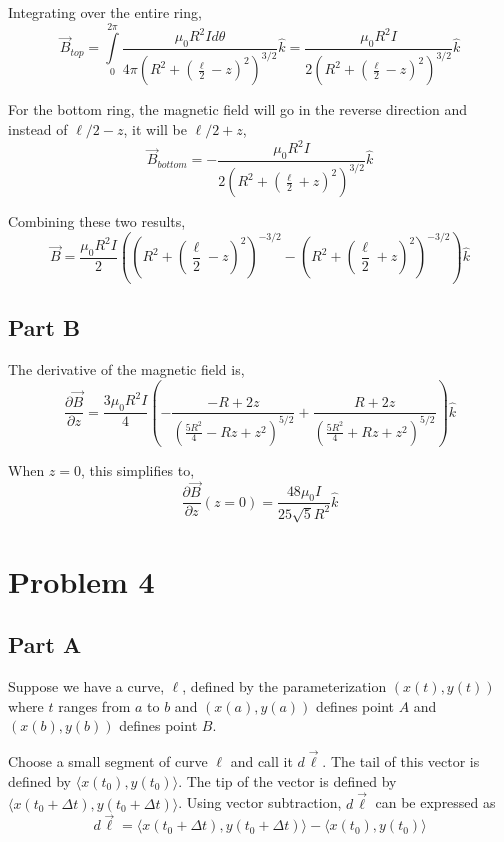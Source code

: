 \documentclass{article}
\begin{document}
Integrating over the entire ring,
$$ \vec{B}_{top} = \int\limits_{0}^{2\pi} \frac{ \mu_{0} R^{2} I d\theta }{ 4 \pi
\left( R^{2} + \left( \frac{ \ell }{ 2 } - z \right)^{2} \right)^{3/2} } \hat{k}
= \frac{ \mu_{0} R^{2} I }{ 2 \left( R^{2} + \left( \frac{ \ell }{ 2
} - z \right)^{2} \right)^{3/2} } \hat{k} $$

For the bottom ring, the magnetic field will go in the reverse direction and
instead of $\ell / 2 - z$, it will be $\ell / 2 + z$,
$$ \vec{B}_{bottom} = - \frac{ \mu_{0} R^{2} I }{ 2 \left( R^{2} + \left( \frac{ \ell }{ 2
} + z \right)^{2} \right)^{3/2} } \hat{k}$$

Combining these two results,
$$ \vec{B} = \frac{ \mu_{0} R^{2} I }{ 2 } \left( \left( R^{2} + \left( \frac{
\ell }{ 2 } - z \right)^{2} \right)^{-3/2} - \left( R^{2} + \left( \frac{ \ell
}{ 2 } + z \right)^{2} \right)^{-3/2} \right) \hat{k}$$

\subsection*{Part B}

The derivative of the magnetic field is,
$$ \frac{ \partial \vec{B} }{ \partial z } = \frac{ 3 \mu_{0}R^{2} I }{ 4 } \left(
-\frac{ -R + 2z }{ \left( \frac{ 5 R^{2} }{ 4 } - Rz + z^{2} \right)^{5/2}}
+ \frac{ R + 2z }{ \left( \frac{ 5R^{2} }{ 4 } + Rz + z^{2} \right)^{5/2}}\right) \hat{k}$$

When $z = 0$, this simplifies to,
$$ \frac{ \partial \vec{B} }{ \partial z }(z = 0) = \frac{ 48 \mu_{0} I }{ 25 \sqrt{5}
R^{2} } \hat{k}$$

\section*{Problem 4}

\subsection*{Part A}

Suppose we have a curve, $\ell$, defined by the parameterization $(x(t), y(t))$
where $t$ ranges from $a$ to $b$ and $(x(a), y(a))$ defines point $A$ and
$(x(b), y(b))$ defines point $B$.

Choose a small segment of curve $\ell$ and call it $d\vec{\ell}$. The tail of
this vector is defined by $\langle x(t_{0}), y(t_{0}) \rangle$. The tip of the
vector is defined by $\langle x(t_{0} + \Delta t), y(t_{0} + \Delta t)\rangle$.
Using vector subtraction, $d\vec{\ell}$ can be expressed as
$$ d\vec{\ell} = \langle x(t_{0} + \Delta t), y(t_{0} + \Delta t) \rangle - \langle x(t_{0}),
y(t_{0}) \rangle $$
\end{document}
